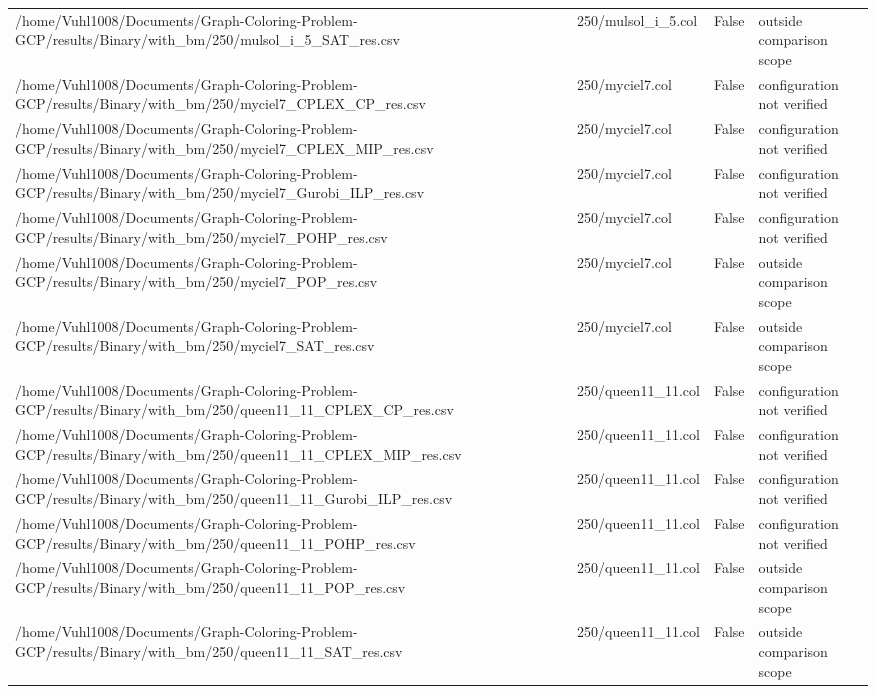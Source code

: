 \begin{table}[htbp]
\begin{tabular}{llll}
/home/Vuhl1008/Documents/Graph-Coloring-Problem-GCP/results/Binary/with\_bm/250/mulsol\_i\_5\_SAT\_res.csv & 250/mulsol\_i\_5.col & False & outside comparison scope \\
/home/Vuhl1008/Documents/Graph-Coloring-Problem-GCP/results/Binary/with\_bm/250/myciel7\_CPLEX\_CP\_res.csv & 250/myciel7.col & False & configuration not verified \\
/home/Vuhl1008/Documents/Graph-Coloring-Problem-GCP/results/Binary/with\_bm/250/myciel7\_CPLEX\_MIP\_res.csv & 250/myciel7.col & False & configuration not verified \\
/home/Vuhl1008/Documents/Graph-Coloring-Problem-GCP/results/Binary/with\_bm/250/myciel7\_Gurobi\_ILP\_res.csv & 250/myciel7.col & False & configuration not verified \\
/home/Vuhl1008/Documents/Graph-Coloring-Problem-GCP/results/Binary/with\_bm/250/myciel7\_POHP\_res.csv & 250/myciel7.col & False & configuration not verified \\
/home/Vuhl1008/Documents/Graph-Coloring-Problem-GCP/results/Binary/with\_bm/250/myciel7\_POP\_res.csv & 250/myciel7.col & False & outside comparison scope \\
/home/Vuhl1008/Documents/Graph-Coloring-Problem-GCP/results/Binary/with\_bm/250/myciel7\_SAT\_res.csv & 250/myciel7.col & False & outside comparison scope \\
/home/Vuhl1008/Documents/Graph-Coloring-Problem-GCP/results/Binary/with\_bm/250/queen11\_11\_CPLEX\_CP\_res.csv & 250/queen11\_11.col & False & configuration not verified \\
/home/Vuhl1008/Documents/Graph-Coloring-Problem-GCP/results/Binary/with\_bm/250/queen11\_11\_CPLEX\_MIP\_res.csv & 250/queen11\_11.col & False & configuration not verified \\
/home/Vuhl1008/Documents/Graph-Coloring-Problem-GCP/results/Binary/with\_bm/250/queen11\_11\_Gurobi\_ILP\_res.csv & 250/queen11\_11.col & False & configuration not verified \\
/home/Vuhl1008/Documents/Graph-Coloring-Problem-GCP/results/Binary/with\_bm/250/queen11\_11\_POHP\_res.csv & 250/queen11\_11.col & False & configuration not verified \\
/home/Vuhl1008/Documents/Graph-Coloring-Problem-GCP/results/Binary/with\_bm/250/queen11\_11\_POP\_res.csv & 250/queen11\_11.col & False & outside comparison scope \\
/home/Vuhl1008/Documents/Graph-Coloring-Problem-GCP/results/Binary/with\_bm/250/queen11\_11\_SAT\_res.csv & 250/queen11\_11.col & False & outside comparison scope \\

\end{tabular}
\end{table}
